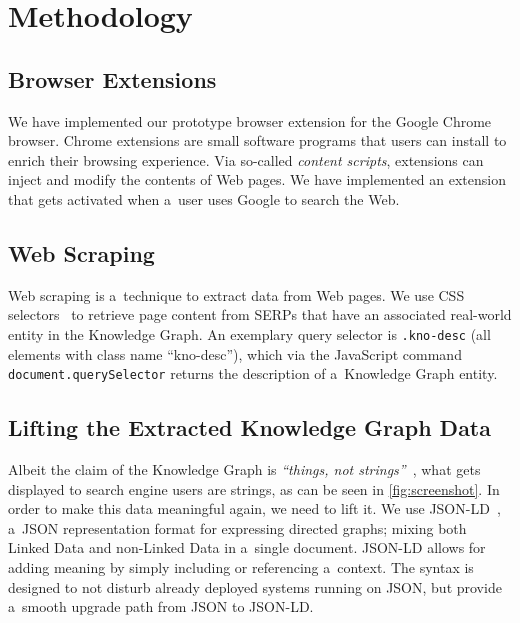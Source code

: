 \documentclass[runningheads,a4paper]{llncs}
\begin{document}
\section{Methodology} \label{sec:methodology}
\subsection{Browser Extensions}
We have implemented our prototype browser extension for the Google Chrome browser.
Chrome extensions are small software programs that users can install
to enrich their browsing experience.
Via so-called \emph{content scripts},
extensions can inject and modify the contents of Web pages.
We have implemented an extension that gets activated when a~user
uses Google to search the Web.

\subsection{Web Scraping}
Web scraping is a~technique to extract data from Web pages.
We use CSS selectors~\cite{hunt2012} to retrieve page content from SERPs
that have an associated real-world entity in the Knowledge Graph.
An exemplary query selector is \texttt{.kno-desc}
(all elements with class name ``kno-desc''),
which via the JavaScript command \texttt{document.querySelector}
returns the description of a~Knowledge Graph entity.

\subsection{Lifting the Extracted Knowledge Graph Data} \label{sec:lifting}
Albeit the claim of the Knowledge Graph is
\textit{``things, not strings''}~\cite{singhal2012_1},
what gets displayed to search engine users are strings,
as can be seen in \autoref{fig:screenshot}.
In order to make this data meaningful again, we need to lift it.
We use JSON-LD~\cite{sporny2012}, a~JSON representation format
for expressing directed graphs;
mixing both Linked Data and non-Linked Data in a~single document.
JSON-LD allows for adding meaning by simply including or referencing a~context.
The syntax is designed to not disturb already deployed systems running on JSON,
but provide a~smooth upgrade path from JSON to JSON-LD.
\end{document}
